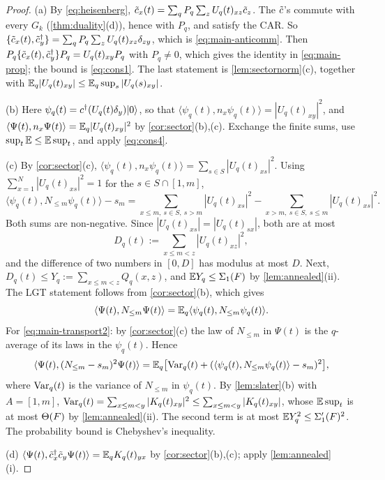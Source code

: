 \begin{proof}
(a) By \eqref{eq:heisenberg}, $\tilde c_x(t)=\sum_qP_q\sum_zU_q(t)_{xz}\tilde c_z$.  The $\tilde c$'s commute with every
$G_k$ (\cref{thm:duality}(d)), hence with $P_q$, and satisfy the CAR.  So
$\{\tilde c_x(t),\tilde c_y^\dagger\}=\sum_qP_q\sum_zU_q(t)_{xz}\delta_{zy}$, which is \eqref{eq:main-anticomm}.
Then $P_q\{\tilde c_x(t),\tilde c_y^\dagger\}P_q=U_q(t)_{xy}P_q$ with $P_q\neq0$, which gives the identity in
\eqref{eq:main-prop}; the bound is \eqref{eq:cons1}.  The last statement is \cref{lem:sectornorm}(c), together with
$\mathbb{E}_q|U_q(t)_{xy}|\le\mathbb{E}_q\sup_s|U_q(s)_{xy}|$.

(b) Here $\psi_q(t)=c^\dagger(U_q(t)\delta_y)|0\rangle$, so that
$\langle\psi_q(t),n_x\psi_q(t)\rangle=|U_q(t)_{xy}|^2$, and
$\langle\Psi(t),n_x\Psi(t)\rangle=\mathbb{E}_q|U_q(t)_{xy}|^2$ by \cref{cor:sector}(b),(c).  Exchange the finite sums,
use $\sup_t\mathbb{E}\le\mathbb{E}\sup_t$, and apply \eqref{eq:cons4}.

(c) By \cref{cor:sector}(c), $\langle\psi_q(t),n_x\psi_q(t)\rangle=\sum_{s\in S}|U_q(t)_{xs}|^2$.  Using
$\sum_{x=1}^N|U_q(t)_{xs}|^2=1$ for the $s\in S\cap[1,m]$,
\[
  \langle\psi_q(t),N_{\le m}\psi_q(t)\rangle-s_m=\sum_{x\le m,\ s\in S,\ s>m}|U_q(t)_{xs}|^2-\sum_{x>m,\ s\in S,\ s\le m}|U_q(t)_{xs}|^2 .
\]
Both sums are non-negative.  Since $|U_q(t)_{xs}|=|U_q(t)_{sx}|$, both are at most
\[
  D_q(t):=\sum_{x\le m<z}|U_q(t)_{xz}|^2,
\]
and the difference of two numbers in $[0,D]$ has modulus at most $D$.  Next, $D_q(t)\le Y_q:=\sum_{x\le m<z}Q_q(x,z)$, and $\mathbb{E} Y_q\le\Sigma_1(F)$ by \cref{lem:annealed}(ii).  The
LGT statement follows from \cref{cor:sector}(b), which gives
\[
  \langle\Psi(t),N_{\le m}\Psi(t)\rangle=\mathbb{E}_q\langle\psi_q(t),N_{\le m}\psi_q(t)\rangle .
\]
For \eqref{eq:main-transport2}: by \cref{cor:sector}(c) the law of $N_{\le m}$ in $\Psi(t)$ is the $q$-average of its
laws in the $\psi_q(t)$.  Hence
\[
  \langle\Psi(t),(N_{\le m}-s_m)^2\Psi(t)\rangle=\mathbb{E}_q\bigl[\operatorname{Var}_q(t)+(\langle\psi_q(t),N_{\le m}\psi_q(t)\rangle-s_m)^2\bigr],
\]
where $\operatorname{Var}_q(t)$ is the variance of $N_{\le m}$ in $\psi_q(t)$.  By \cref{lem:slater}(b) with $A=[1,m]$,
$\operatorname{Var}_q(t)=\sum_{x\le m<y}|K_q(t)_{xy}|^2\le\sum_{x\le m<y}|K_q(t)_{xy}|$, whose $\mathbb{E}\sup_t$ is at most $\Theta(F)$ by
\cref{lem:annealed}(ii).  The second term is at most $\mathbb{E} Y_q^2\le\Sigma_1'(F)^2$.  The probability bound is
Chebyshev's inequality.

(d) $\langle\Psi(t),\tilde c_x^\dagger\tilde c_y\Psi(t)\rangle=\mathbb{E}_qK_q(t)_{yx}$ by \cref{cor:sector}(b),(c); apply
\cref{lem:annealed}(i).
\end{proof}

